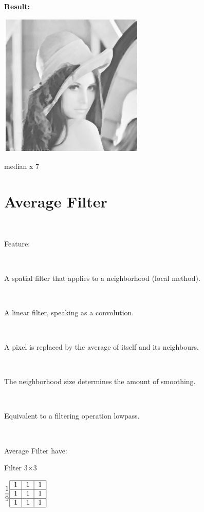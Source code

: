 \textbf{Result:}

\begin{center}
	\includegraphics{median1.png}
	
	median x 7
\end{center}

\section{Average Filter}

\

Feature: 

\

A spatial filter that applies to a neighborhood (local method).

\

A linear filter, speaking as a convolution.

\

A pixel is replaced by the average of itself and its neighbours.

\

The neighborhood size determines the amount of smoothing.

\

Equivalent to a filtering operation lowpass.

\

Average Filter have: 
\begin{center}
	Filter 3$\times$3

$\dfrac{1}{9}\begin{tabular}{|c|c|c|}
\hline 
1 & 1 & 1 \\ 
\hline 
1 & 1 & 1 \\ 
\hline 
1 & 1 & 1 \\ 
\hline 
\end{tabular}$ 	
\end{center}

\

